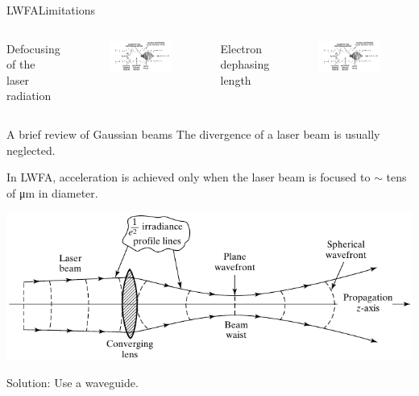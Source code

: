 \documentclass[]{beamer}
\begin{document}
  \begin{frame}{LWFA}{Limitations}
    \begin{columns}  
    Defocusing of the laser radiation
      \begin{figure}
          \includegraphics[width=\textwidth]{figures/theory/lwfa-schematic.PNG}
      \end{figure}
      Electron dephasing length
      \begin{figure}
          \includegraphics[width=\textwidth]{figures/theory/lwfa-schematic.PNG}
      \end{figure}
    \end{columns}
  \end{frame}
  \begin{frame}{A brief review of Gaussian beams}
    The divergence of a laser beam is usually neglected.

    In LWFA, acceleration is achieved only when the laser beam is focused to $\sim$ tens of \si{\um} in diameter.
    \begin{center}
      \includegraphics[width=\textwidth]{figures/theory/laser_lens_rayleigh.pdf}
    \end{center}
    Solution: Use a waveguide.
  \end{frame}
\end{document}
